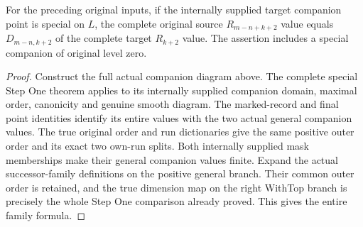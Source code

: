 \begin{theorem}
\label{hir:smooth-original-general-special-companion-value}
\leanok
{}
For the preceding original inputs, if the internally supplied target
companion point is special on $L$, the complete original source
$R_{m-n+k+2}$ value equals $D_{m-n,k+2}$ of the complete target $R_{k+2}$
value.  The assertion includes a special companion of original level zero.
\end{theorem}
\begin{proof}
Construct the full actual companion diagram above.  The complete special
Step One theorem applies to its internally supplied companion domain,
maximal order, canonicity and genuine smooth diagram.  The marked-record
and final point identities identify its entire values with the two actual
general companion values.  The true original order and run dictionaries
give the same positive outer order and its exact two own-run splits.
Both internally supplied mask memberships make their general companion
values finite.  Expand the actual successor-family definitions on the
positive general branch.  Their common outer order is retained, and the
true dimension map on the right WithTop branch is precisely the whole
Step One comparison already proved.  This gives the entire family formula.
\end{proof}

